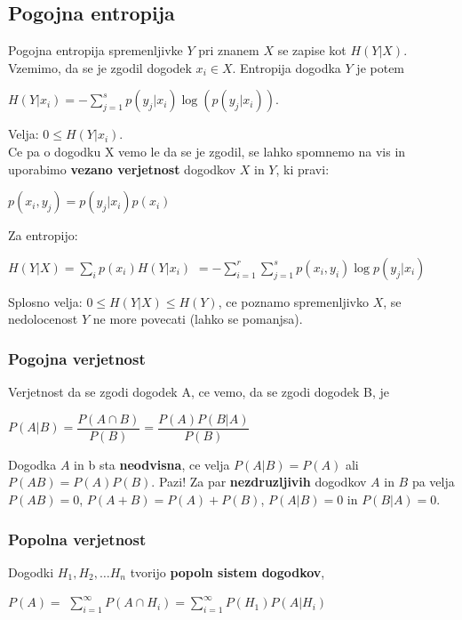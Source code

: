 \documentclass{article}
\begin{document}
\begin{multicols}{4}
\subsection{Pogojna entropija}
Pogojna entropija spremenljivke $Y$ pri znanem $X$ se zapise kot $H(Y|X)$.
Vzemimo, da se je zgodil dogodek $x_i \in X$. Entropija dogodka $Y$ je potem
\begin{center}
    \begin{math}
        H(Y|x_i) = - \sum_{j=1}^s p(y_j|x_i) \log(p(y_j| x_i)).
    \end{math}
\end{center}
Velja: $0 \leq H(Y| x_i)$.\\
Ce pa o dogodku X vemo le da se je zgodil, se lahko spomnemo na vis in uporabimo
\textbf{vezano verjetnost} dogodkov $X$ in $Y$, ki pravi:
\begin{center}
    \begin{math}
        p(x_i, y_j) = p(y_j|x_i)p(x_i)
    \end{math}
\end{center}
Za entropijo:
\begin{center}
    \begin{math}
        H(Y|X) = \sum_{i} p(x_i)H(Y|x_i)
    \end{math}
    \begin{math}
        = -\sum_{i=1}^r \sum_{j=1}^s p(x_i, y_i) \log p(y_j | x_i)
    \end{math}
\end{center}
Splosno velja: $0 \leq H(Y|X) \leq H(Y)$, ce poznamo spremenljivko $X$, se nedolocenost $Y$ ne more povecati (lahko se pomanjsa).

\subsubsection{Pogojna verjetnost}
Verjetnost da se zgodi dogodek A, ce vemo, da se zgodi dogodek B, je
\begin{center}
    \begin{math}
        P(A | B) = \dfrac{P(A \cap B)}{P(B)} = \dfrac{P(A)P(B|A)}{P(B)}
    \end{math}
\end{center}
Dogodka $A$ in b sta \textbf{neodvisna}, ce velja $P(A | B) = P(A)$ ali
$P(A B) = P(A)P(B)$.
Pazi! Za par \textbf{nezdruzljivih} dogodkov $A$ in $B$
pa velja $P(AB) = 0$,  $P(A + B) = P(A) + P(B)$, $P(A|B) = 0$ in $P(B|A) = 0$.

\subsubsection{Popolna verjetnost}
Dogodki $H_{1}, H_{2}, \dots H_{n}$ tvorijo \textbf{popoln sistem dogodkov},
\begin{center}
    \begin{math}
        P(A) =
    \end{math}
    \smallskip
    \begin{math}
        \sum_{i=1}^{\infty} P(A \cap H_{i}) =
        \sum_{i=1}^{\infty} P(H_{1}) P(A | H_{i})
    \end{math}
\end{center}


\end{multicols}
\end{document}
